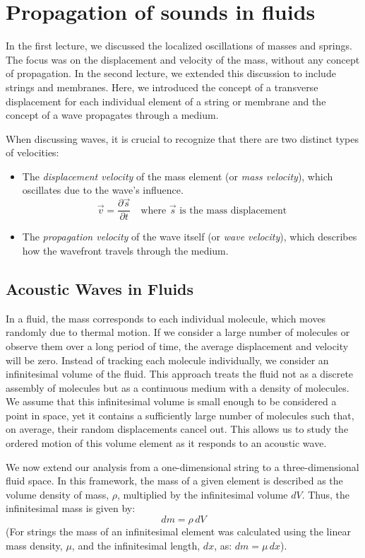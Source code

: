 \documentclass[a4paper]{article}
\begin{document}
\section{Propagation of sounds in fluids}

In the first lecture, we discussed the localized oscillations of masses and springs. The focus was on the displacement and velocity of the mass, without any concept of propagation. In the second lecture, we extended this discussion to include strings and membranes. Here, we introduced the concept of a transverse displacement for each individual element of a string or membrane and the concept of a wave propagates through a medium.

When discussing waves, it is crucial to recognize that there are two distinct types of velocities:
\begin{itemize}
    \item The \textit{displacement velocity} of the mass element (or \textit{mass velocity}), which oscillates due to the wave's influence. 
    \[
\vec{v} = \frac{\partial \vec{s}}{\partial t} \quad \text{where \(\vec{s}\) is the mass displacement} 
\]
    \item The \textit{propagation velocity} of the wave itself (or \textit{wave velocity}), which describes how the wavefront travels through the medium.
\end{itemize}

\subsection{Acoustic Waves in Fluids}

In a fluid, the mass corresponds to each individual molecule, which moves randomly due to thermal motion. If we consider a large number of molecules or observe them over a long period of time, the average displacement and velocity will be zero. Instead of tracking each molecule individually, we consider an infinitesimal volume of the fluid. This approach treats the fluid not as a discrete assembly of molecules but as a continuous medium with a density of molecules. We assume that this infinitesimal volume is small enough to be considered a point in space, yet it contains a sufficiently large number of molecules such that, on average, their random displacements cancel out. This allows us to study the ordered motion of this volume element as it responds to an acoustic wave. 

We now extend our analysis from a one-dimensional string to a three-dimensional fluid space. In this framework, the mass of a given element is described as the volume density of mass, \(\rho\), multiplied by the infinitesimal volume \(dV\). Thus, the infinitesimal mass is given by:
\[
dm = \rho \, dV
\]
(For strings the mass of an infinitesimal element was calculated using the linear mass density, \(\mu\), and the infinitesimal length, \(dx\), as:
\(
dm = \mu \, dx
\)).
\end{document}

